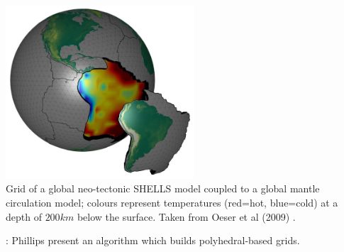 \begin{center}
\includegraphics[width=7cm]{images/meshes/oebm09}\\
{\captionfont Grid of a global neo-tectonic SHELLS model coupled to a global mantle
circulation model; colours represent temperatures (red=hot, blue=cold)
at a depth of $200\si{km}$ below the surface. Taken from Oeser et al (2009) \cite{oebm09}.}
\end{center}

\Literature: Phillips \etal \cite{phdo19} present an algorithm which builds polyhedral-based grids.





